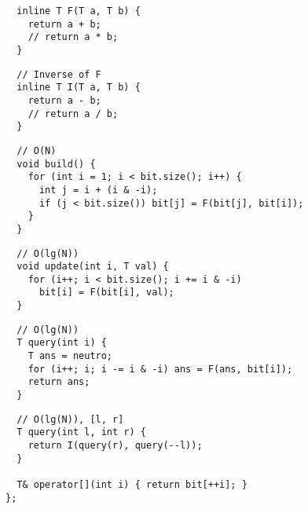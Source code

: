 \documentclass[twoside]{article}
\begin{document}
\begin{multicols*}{2}
\begin{verbatim}
  inline T F(T a, T b) {
    return a + b;
    // return a * b;
  }
\end{verbatim}
\vspace{-12pt}
\begin{verbatim}
  // Inverse of F
  inline T I(T a, T b) {
    return a - b;
    // return a / b;
  }
\end{verbatim}
\vspace{-12pt}
\begin{verbatim}
  // O(N)
  void build() {
    for (int i = 1; i < bit.size(); i++) {
      int j = i + (i & -i);
      if (j < bit.size()) bit[j] = F(bit[j], bit[i]);
    }
  }
\end{verbatim}
\vspace{-12pt}
\begin{verbatim}
  // O(lg(N))
  void update(int i, T val) {
    for (i++; i < bit.size(); i += i & -i)
      bit[i] = F(bit[i], val);
  }
\end{verbatim}
\vspace{-12pt}
\begin{verbatim}
  // O(lg(N))
  T query(int i) {
    T ans = neutro;
    for (i++; i; i -= i & -i) ans = F(ans, bit[i]);
    return ans;
  }
\end{verbatim}
\vspace{-12pt}
\begin{verbatim}
  // O(lg(N)), [l, r]
  T query(int l, int r) {
    return I(query(r), query(--l));
  }

  T& operator[](int i) { return bit[++i]; }
};
\end{verbatim}

\subsubsectionfont{\large\bfseries\sffamily\underline}

\end{multicols*}
\end{document}
